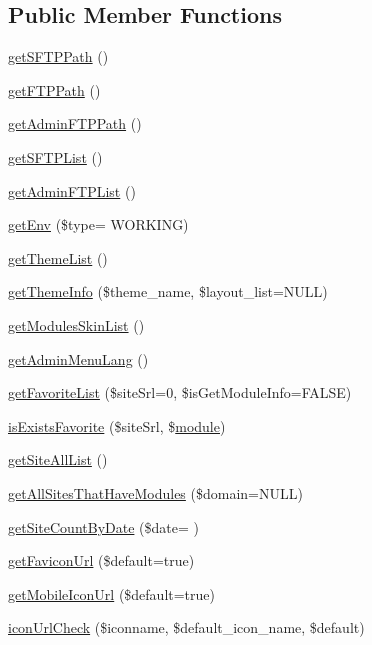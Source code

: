 \subsection*{Public Member Functions}
\begin{DoxyCompactItemize}
\item 
\hyperlink{classadminAdminModel_aaeac1a0a11439dfb4faa74751da8747e}{get\+S\+F\+T\+P\+Path} ()
\item 
\hyperlink{classadminAdminModel_a388c46fe906b6658eda70407ff9cdadb}{get\+F\+T\+P\+Path} ()
\item 
\hyperlink{classadminAdminModel_a155e29f18f17c6c657a457fcd65fd24b}{get\+Admin\+F\+T\+P\+Path} ()
\item 
\hyperlink{classadminAdminModel_adea58838b8595a28dc84d562bd1816ed}{get\+S\+F\+T\+P\+List} ()
\item 
\hyperlink{classadminAdminModel_a9e944aba1586e011811993745738728e}{get\+Admin\+F\+T\+P\+List} ()
\item 
\hyperlink{classadminAdminModel_afbd791a2932cb6f9f3d0550f4377829a}{get\+Env} (\$type= \textquotesingle{}W\+O\+R\+K\+I\+N\+G\textquotesingle{})
\item 
\hyperlink{classadminAdminModel_a2a331c8f7fea9c12f56f5f5f75a3960c}{get\+Theme\+List} ()
\item 
\hyperlink{classadminAdminModel_afa7d3525c94669a9cdd141051213a765}{get\+Theme\+Info} (\$theme\+\_\+name, \$layout\+\_\+list=N\+U\+L\+L)
\item 
\hyperlink{classadminAdminModel_adde903c6e5edecd8b68b1afb232c92fe}{get\+Modules\+Skin\+List} ()
\item 
\hyperlink{classadminAdminModel_a6e21a5731925dc94cce1859dd96e7f25}{get\+Admin\+Menu\+Lang} ()
\item 
\hyperlink{classadminAdminModel_aa50a1de27a9e8431e5a17fffc053dc1e}{get\+Favorite\+List} (\$site\+Srl=0, \$is\+Get\+Module\+Info=F\+A\+L\+S\+E)
\item 
\hyperlink{classadminAdminModel_a6ba3dfaa5f5f1cc41284676b9e0b7b9d}{is\+Exists\+Favorite} (\$site\+Srl, \$\hyperlink{classmodule}{module})
\item 
\hyperlink{classadminAdminModel_a12f25a1c61e11bf727019171564b1cad}{get\+Site\+All\+List} ()
\item 
\hyperlink{classadminAdminModel_afca5a07a3f42ccc8c2f635557c668b44}{get\+All\+Sites\+That\+Have\+Modules} (\$domain=N\+U\+L\+L)
\item 
\hyperlink{classadminAdminModel_a7123fd762d0fbefec95c0fa6263ffd62}{get\+Site\+Count\+By\+Date} (\$date= \textquotesingle{}\textquotesingle{})
\item 
\hyperlink{classadminAdminModel_a94cadc80816d875f0713507d356c422b}{get\+Favicon\+Url} (\$default=true)
\item 
\hyperlink{classadminAdminModel_a3ebcb91feca1cf88d6ed0bce9355ca6b}{get\+Mobile\+Icon\+Url} (\$default=true)
\item 
\hyperlink{classadminAdminModel_ab77b7dd452e81ca285debe37a159e0d7}{icon\+Url\+Check} (\$iconname, \$default\+\_\+icon\+\_\+name, \$default)
\end{DoxyCompactItemize}
